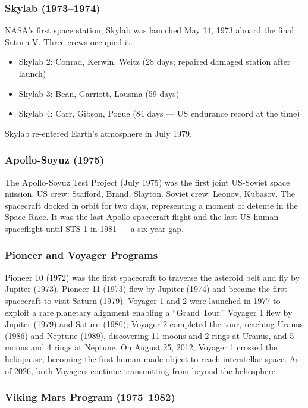 \documentclass[11pt,letterpaper]{article}
\begin{document}
\subsubsection{Skylab (1973--1974)}

NASA's first space station, Skylab was launched May 14, 1973 aboard the final Saturn V. Three crews occupied it:
\begin{itemize}[leftmargin=*]
  \item Skylab 2: Conrad, Kerwin, Weitz (28 days; repaired damaged station after launch)
  \item Skylab 3: Bean, Garriott, Lousma (59 days)
  \item Skylab 4: Carr, Gibson, Pogue (84 days --- US endurance record at the time)
\end{itemize}
Skylab re-entered Earth's atmosphere in July 1979.

\subsubsection{Apollo-Soyuz (1975)}

The Apollo-Soyuz Test Project (July 1975) was the first joint US-Soviet space mission. US crew: Stafford, Brand, Slayton. Soviet crew: Leonov, Kubasov. The spacecraft docked in orbit for two days, representing a moment of detente in the Space Race. It was the last Apollo spacecraft flight and the last US human spaceflight until STS-1 in 1981 --- a six-year gap.

\subsubsection{Pioneer and Voyager Programs}

Pioneer 10 (1972) was the first spacecraft to traverse the asteroid belt and fly by Jupiter (1973). Pioneer 11 (1973) flew by Jupiter (1974) and became the first spacecraft to visit Saturn (1979). Voyager 1 and 2 were launched in 1977 to exploit a rare planetary alignment enabling a ``Grand Tour.'' Voyager 1 flew by Jupiter (1979) and Saturn (1980); Voyager 2 completed the tour, reaching Uranus (1986) and Neptune (1989), discovering 11 moons and 2 rings at Uranus, and 5 moons and 4 rings at Neptune. On August 25, 2012, Voyager 1 crossed the heliopause, becoming the first human-made object to reach interstellar space. As of 2026, both Voyagers continue transmitting from beyond the heliosphere.

\subsubsection{Viking Mars Program (1975--1982)}
\end{document}
